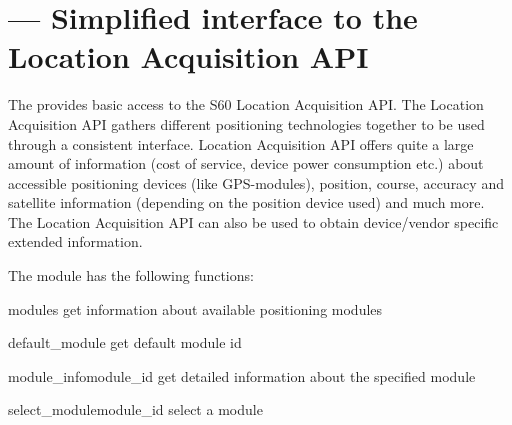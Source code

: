 %
%
%


\section{ ---
         Simplified interface to the Location Acquisition API}
\label{sec:position}


The  provides basic access to the S60 Location Acquisition API. 
The Location Acquisition API gathers different positioning technologies together to be used 
through a consistent interface. Location Acquisition API offers quite a large 
amount of information (cost of service, device power consumption etc.) about 
accessible positioning devices (like GPS-modules), position, course, accuracy 
and satellite information (depending on the position device used) and much 
more. The Location Acquisition API can also be used to obtain device/vendor 
specific extended information.

The  module has the following functions:

\begin{funcdesc}{modules}{}
get information about available positioning modules
\end{funcdesc}

\begin{funcdesc}{default_module}{}
get default module id
\end{funcdesc}

\begin{funcdesc}{module_info}{module_id}
get detailed information about the specified module
\end{funcdesc}

\begin{funcdesc}{select_module}{module_id}
select a module
\end{funcdesc}

